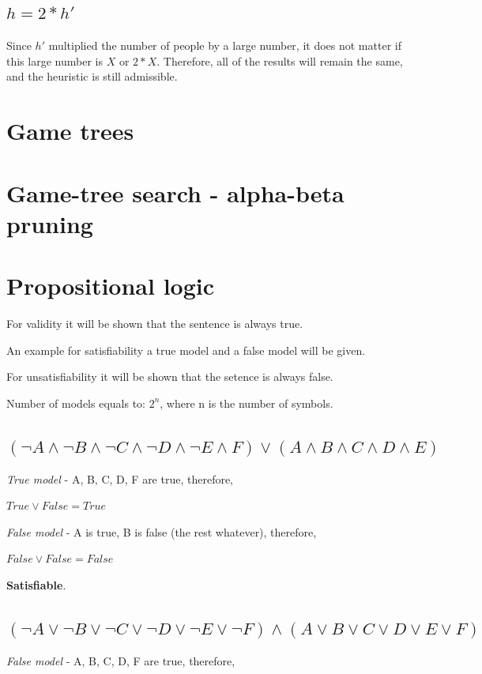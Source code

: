 \documentclass{article}                     %
\newcommand{\nt}[1]{\neg #1}
\begin{document}
	\subsection{$ h=2 * h' $}
	Since $ h' $ multiplied the number of people by a large number, it does not matter if this large number is $ X $ or $ 2*X $. Therefore, all of the results will remain the same, and the heuristic is still admissible.
	
	\section{Game trees}
	
	
	\section{Game-tree search - alpha-beta pruning}
	
	
	\section{Propositional logic}
	For validity it will be shown that the sentence is always true.
	
	An example for satisfiability a true model and a false model will be given.
	
	For unsatisfiability it will be shown that the setence is always false.
	
	Number of models equals to: $ 2^n $, where n is the number of symbols.
	
	\subsection{$ (\nt{A} \land \nt{B} \land \nt{C} \land \nt{D} \land \nt{E} \land F) \lor (A \land B \land C \land D \land E)$}
	\textit{True model} - A, B, C, D, F are true, therefore,
	
	$ True \lor False = True$
	
	\textit{False model} - A is true, B is false (the rest whatever), therefore,

	$ False \lor False = False $
	
	\textbf{Satisfiable}.
	\subsection{$ (\nt{A} \lor \nt{B} \lor \nt{C} \lor \nt{D} \lor \nt{E} \lor \nt{F}) \land (A \lor B \lor C \lor D \lor E \lor F)$}
	\textit{False model} - A, B, C, D, F are true, therefore,
	
\end{document}
